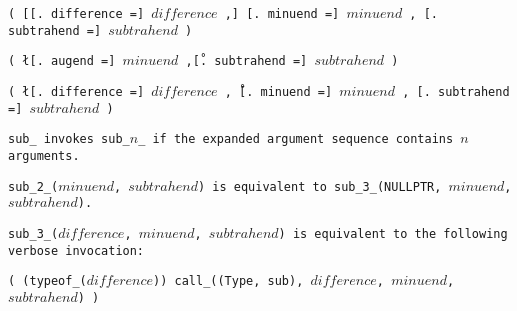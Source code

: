 
\s\s\s\tt{(} [[\tt{. difference =}] $difference$ \tt{,}]
[\tt{. minuend =}] $minuend$ \tt{,} [\tt{. subtrahend =}] $subtrahend$ \tt{)}

\s\tt{(} \l[\tt{. augend =}]
$minuend$ \tt{,}\r [\tt{. subtrahend =}] $subtrahend$ \tt{)}

\s\tt{(} \l[\tt{. difference =}] $difference$ \tt{,}\r\
[\tt{. minuend =}] $minuend$ \tt{,} [\tt{. subtrahend =}] $subtrahend$ \tt{)}


\tt{sub_} invokes \tt{sub_}$n$\_ if the
expanded argument sequence contains $n$ arguments.

\tt{sub_2_(}$minuend$\tt{,} $subtrahend$\tt{)} is equivalent to
\tt{sub_3_(NULLPTR,} $minuend$\tt{,} $subtrahend$\tt{)}.

\tt{sub_3_(}$difference$\tt{,} $minuend$\tt{,} $subtrahend$\tt{)}
is equivalent to the following verbose invocation:

\enlargethispage*{\baselineskip}
\begin{center}
\tt{( (typeof_(}$difference$\tt{)) call_((Type, sub),}
$difference$\tt{,} $minuend$\tt{,} $subtrahend$\tt{) )}
\end{center}
